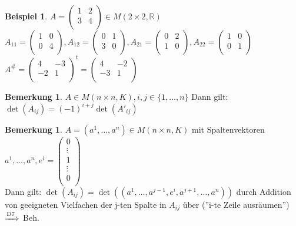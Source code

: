 \documentclass[10pt,a4paper,numbers=endperiod]{scrartcl}
\theoremstyle{definition}
\newtheorem{bem}[satz]{Bemerkung}
\newtheorem{bsp}[satz]{Beispiel}
\def\RR{{\mathbb R}}
\begin{document}
\begin{bsp}
	$A = \begin{pmatrix}
	1 & 2\\
	3 & 4\\
	\end{pmatrix} \in M(2\times 2, \RR)$\\
	
	$A_{11} = \begin{pmatrix}
	1 & 0\\
	0 & 4\\
	\end{pmatrix}, A_{12} = \begin{pmatrix}
	0 & 1\\
	3 & 0\\
	\end{pmatrix}, A_{21} = \begin{pmatrix}
	0 & 2\\
	1 & 0\\
	\end{pmatrix}, A_{22} = \begin{pmatrix}
	1 & 0\\
	0 & 1\\
	\end{pmatrix}$\\
	
	$A^\# = \begin{pmatrix}
	4 & -3\\
	-2 & 1\\
	\end{pmatrix}^t = \begin{pmatrix}
	4 & -2\\
	-3 & 1\\
	\end{pmatrix}$ 
\end{bsp}

\begin{bem}
	$A \in M(n\times n, K), i,j \in \{1,\ldots,n\}$ Dann gilt:\\
	$\det(A_{ij}) = (-1)^{i+j} \det(A'_{ij})$
\end{bem}

\begin{bem}
	$A = (a^1, \ldots, a^n) \in M(n \times n, K)$ mit Spaltenvektoren $a^1, \ldots, a^n, e^i = \begin{pmatrix}
	0\\\vdots\\1\\\vdots\\0\\
	\end{pmatrix}$\\
	Dann gilt: $\det(A_{ij}) = \det((a^1,\ldots,a^{j-1},e^i,a^{j+1},\ldots, a^n))$ durch Addition von geeigneten Vielfachen der j-ten Spalte in $A_{ij}$ über (''i-te Zeile ausräumen'') $\xRightarrow[]{\text{D7}}$ Beh.
\end{bem}
\end{document}
